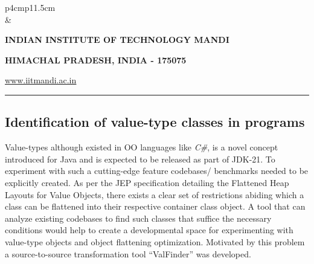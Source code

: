 \documentclass[12 pt, a4paper]{article}
\newcommand{\HRule}{\rule{\linewidth}{1mm}}
\begin{document}
\pagestyle{empty}
\vskip 0.2cm
	\begin{tabular}{p{4cm}p{11.5cm}}
		  \\
		& \centering \large\bf\phantom{Empty line}\\ 
		\rule{0pt}{1pt} \centering \large\bf{INDIAN INSTITUTE OF TECHNOLOGY MANDI} \\
		\rule{0pt}{1pt} \centering \large\bf{HIMACHAL PRADESH, INDIA - 175075} \\
		\rule{0pt}{1pt} \centering \underline{\href{www.iitmandi.ac.in}{www.iitmandi.ac.in}}\\
	\end{tabular}
\noindent

{\raggedleft{}\HRule}

\subsection{Identification of value-type classes in programs}
Value-types although existed in OO languages like {\em C\#}, is a novel concept 
introduced for Java and is expected to be released as part of 
JDK-21. To experiment with such a cutting-edge feature 
codebases/ benchmarks needed to be explicitly created. 
As per the JEP specification \citep{JEPP} 
detailing the Flattened Heap Layouts for Value Objects,  
there exists a clear set of restrictions abiding which a class
can be flattened into their respective container class object.
A tool that can analyze existing codebases to find such classes that suffice the necessary conditions would help to
create a developmental space for experimenting with value-type objects and object flattening optimization.
 Motivated by this problem a source-to-source transformation tool ``ValFinder'' was 
developed.
	
\end{document}
